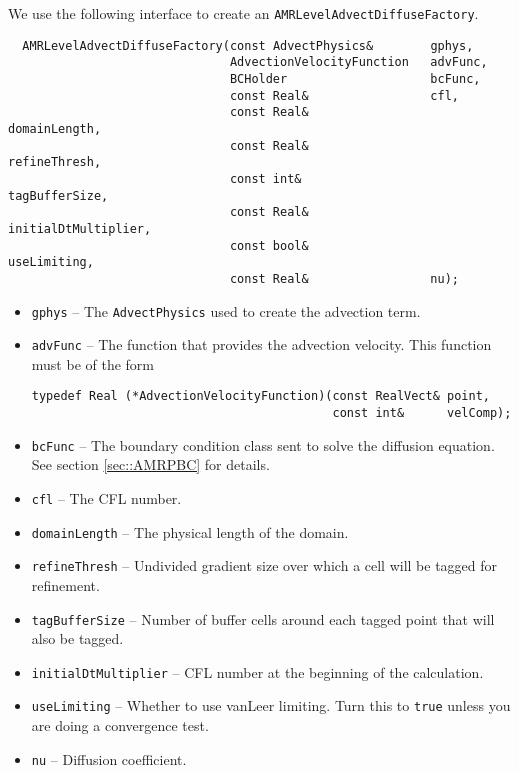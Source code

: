 We use the following interface to create an \verb|AMRLevelAdvectDiffuseFactory|.
\begin{small}
\begin{verbatim}
  AMRLevelAdvectDiffuseFactory(const AdvectPhysics&        gphys,  
                               AdvectionVelocityFunction   advFunc,
                               BCHolder                    bcFunc, 
                               const Real&                 cfl,
                               const Real&                 domainLength,
                               const Real&                 refineThresh,
                               const int&                  tagBufferSize,
                               const Real&                 initialDtMultiplier,
                               const bool&                 useLimiting,
                               const Real&                 nu);

\end{verbatim}
\end{small}
\begin{itemize}
\item \verb|gphys| -- The \verb|AdvectPhysics| used to create the advection term.  
\item \verb|advFunc| -- The function that provides the advection velocity.
  This function must be of the form
\begin{small}
\begin{verbatim}
typedef Real (*AdvectionVelocityFunction)(const RealVect& point,
                                          const int&      velComp);
\end{verbatim}
\end{small}
\item \verb|bcFunc| -- The boundary condition class sent to solve the
  diffusion equation.   See section \ref{sec::AMRPBC} for details.
\item \verb|cfl| -- The CFL number.
\item \verb|domainLength| -- The physical length of the domain.
\item \verb|refineThresh| -- Undivided gradient size over which a cell will be
  tagged for refinement.
\item \verb|tagBufferSize| -- Number of buffer cells around each tagged point
  that will also be tagged.
\item \verb|initialDtMultiplier| -- CFL number at the beginning of the calculation.
\item \verb|useLimiting| -- Whether to use vanLeer limiting.  Turn this to
  \verb|true| unless you are doing a convergence test.
\item \verb|nu| -- Diffusion coefficient.
\end{itemize}

